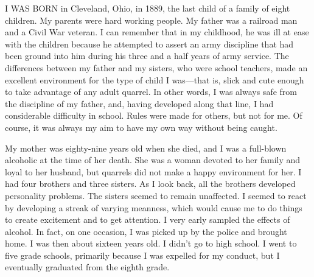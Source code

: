 

\bbChapterPreamble




\begin{biblechapter}
    I WAS BORN in Cleveland, Ohio, in 1889, 
    the last child of a family of eight children.
\verse My parents were hard working people.
\verse My father was a railroad man and a Civil War veteran.
\verse I can remember that in my childhood, 
    he was ill at ease with the children 
    because he attempted to assert an army discipline 
    that had been ground into him 
    during his three and a half years of army service.
\verse The differences between my father and my sisters, 
    who were school teachers, 
    made an excellent environment for the type of child I was—that is, 
    slick and cute enough to take advantage of any adult quarrel.
\verse In other words, 
    I was always safe from the discipline of my father, 
    and, having developed along that line, 
    I had considerable difficulty in school.
\verse Rules were made for others, but not for me.
\verse Of course, 
    it was always my aim to have my own way without being caught.

\verse My mother was eighty-nine years old when she died, and I was a full-blown alcoholic at the time of her death. She was a woman devoted to her family and loyal to her husband, but quarrels did not make a happy environment for her. I had four brothers and three sisters. As I look back, all the brothers developed personality problems. The sisters seemed to remain unaffected. I seemed to react by developing a streak of varying meanness, which would cause me to do things to create excitement and to get attention. I very early sampled the effects of alcohol. In fact, on one occasion, I was picked up by the police and brought home. I was then about sixteen years old. I didn’t go to high school. I went to five grade schools, primarily because I was expelled for my conduct, but I eventually graduated from the eighth grade.


\end{biblechapter}
